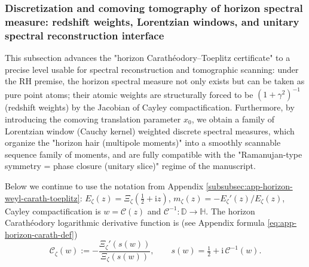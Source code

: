 \subsubsection{Discretization and comoving tomography of horizon spectral measure: redshift weights, Lorentzian windows, and unitary spectral reconstruction interface}\label{subsubsec:xi-horizon-spectral-measure-tomography}
This subsection advances the "horizon Carath\'eodory--Toeplitz certificate" to a precise level usable for spectral reconstruction and tomographic scanning: under the RH premise, the horizon spectral measure not only exists but can be taken as pure point atoms; their atomic weights are structurally forced to be \((1+\gamma^{2})^{-1}\) (redshift weights) by the Jacobian of Cayley compactification.
Furthermore, by introducing the comoving translation parameter \(x_0\), we obtain a family of Lorentzian window (Cauchy kernel) weighted discrete spectral measures, which organize the "horizon hair (multipole moments)" into a smoothly scannable sequence family of moments, and are fully compatible with the "Ramanujan-type symmetry = phase closure (unitary slice)" regime of the manuscript.
\par
Below we continue to use the notation from Appendix \ref{subsubsec:app-horizon-weyl-carath-toeplitz}: \(E_{\zeta}(z)=\Xi_{\zeta}(\tfrac12+\mathrm{i}z)\), \(m_{\zeta}(z)=-E_{\zeta}'(z)/E_{\zeta}(z)\), Cayley compactification is \(w=\mathcal{C}(z)\) and \(\mathcal{C}^{-1}:\mathbb{D}\to\mathbb{H}\).
The horizon Carath\'eodory logarithmic derivative function is (see Appendix formula \eqref{eq:app-horizon-carath-def})
\[
  \mathscr{C}_{\zeta}(w):=-\frac{\Xi_{\zeta}'(s(w))}{\Xi_{\zeta}(s(w))},
  \qquad s(w)=\tfrac12+\mathrm{i}\,\mathcal{C}^{-1}(w).
\]

